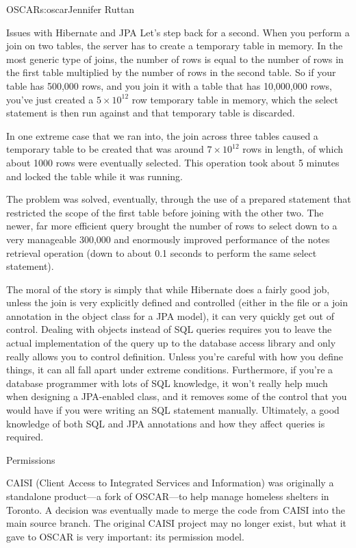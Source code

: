 \begin{aosachapter}{OSCAR}{s:oscar}{Jennifer Ruttan}
\begin{aosasect2}{Issues with Hibernate and JPA}
Let's step back for a second. When you perform a join on two tables,
the server has to create a temporary table in memory. In the most
generic type of joins, the number of rows is equal to the number of
rows in the first table multiplied by the number of rows in the second
table. So if your table has 500,000 rows, and you join it with a table
that has 10,000,000 rows, you've just created a $5{\times}10^{12}$ row
temporary table in memory, which the select statement is then run against and
that temporary table is discarded.

In one extreme case that we ran into, the join across
three tables caused a temporary table to be created that was 
around $7{\times}10^{12}$ rows in length, of which about
1000 rows were eventually selected. This operation took about 5
minutes and locked the  table while it was running.

The problem was solved, eventually, through the use of a prepared
statement that restricted the scope of the first table before joining
with the other two. The newer, far more efficient query brought the
number of rows to select down to a very manageable 300,000 and
enormously improved performance of the notes retrieval operation (down
to about 0.1 seconds to perform the same select statement).

The moral of the story is simply that while Hibernate does a fairly
good job, unless the join is very explicitly defined and controlled
(either in the  file or a join annotation in the object class
for a JPA model), it can very quickly get out of control. Dealing with
objects instead of SQL queries requires you to leave the actual
implementation of the query up to the database access library and only
really allows you to control definition. Unless you're careful with
how you define things, it can all fall apart under extreme
conditions. Furthermore, if you're a database programmer with lots of
SQL knowledge, it won't really help much when designing a
JPA-enabled class, and it removes some of the control that you would
have if you were writing an SQL statement manually. Ultimately, a good
knowledge of both SQL and JPA annotations and how they affect
queries is required.

\end{aosasect2}

\begin{aosasect1}{Permissions}

CAISI (Client Access to Integrated Services and Information) was originally a standalone product---a fork of OSCAR---to help
manage homeless shelters in Toronto. A decision was eventually made to
merge the code from CAISI into the main source branch. The original
CAISI project may no longer exist, but what it gave to OSCAR is very
important: its permission model.


\end{aosasect1}
\end{aosachapter}
